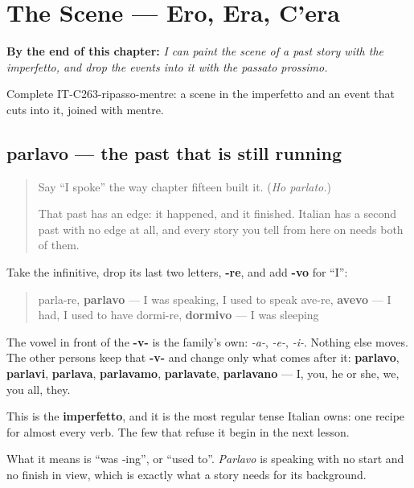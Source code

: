 
\chapter{The Scene --- Ero, Era, C'era}
\label{ch:it-the-scene}

\begin{chapteropening}
\textbf{By the end of this chapter:} \emph{I can paint the scene of a past story with the imperfetto, and drop the events into it with the passato prossimo.}

Complete IT-C263-ripasso-mentre: a scene in the imperfetto and an event that cuts into it, joined with mentre.
\end{chapteropening}

\section[parlavo, avevo, dormivo]{parlavo — the past that is still running}

\label{lesson:IT-C263-parlavo}



\begin{quote}
Say \textquotedblleft{}I spoke\textquotedblright{} the way chapter fifteen built it. (\emph{Ho parlato.})

That past has an edge: it happened, and it finished. Italian has a second past with no edge at all, and every story you tell from here on needs both of them.
\end{quote}

\begin{grammarlens}[title={Grammar Lens: one ending, three families}]
Take the infinitive, drop its last two letters, \textbf{-re}, and add \textbf{-vo} for \textquotedblleft{}I\textquotedblright{}:

\begin{quote}
parla-re, \textbf{parlavo} — I was speaking, I used to speak ave-re, \textbf{avevo} — I had, I used to have dormi-re, \textbf{dormivo} — I was sleeping
\end{quote}

The vowel in front of the \textbf{-v-} is the family's own: \emph{-a-}, \emph{-e-}, \emph{-i-}. Nothing else moves. The other persons keep that \textbf{-v-} and change only what comes after it: \textbf{parlavo}, \textbf{parlavi}, \textbf{parlava}, \textbf{parlavamo}, \textbf{parlavate}, \textbf{parlavano} — I, you, he or she, we, you all, they.

This is the \textbf{imperfetto}, and it is the most regular tense Italian owns: one recipe for almost every verb. The few that refuse it begin in the next lesson.

What it means is \textquotedblleft{}was ‑ing\textquotedblright{}, or \textquotedblleft{}used to\textquotedblright{}. \emph{Parlavo} is speaking with no start and no finish in view, which is exactly what a story needs for its background.
\end{grammarlens}

